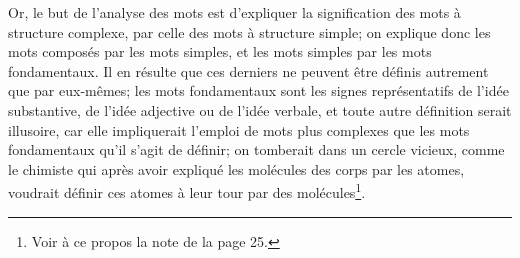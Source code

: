 {    Or, le but de l’analyse des mots est d’expliquer la signification
    des mots à structure complexe, par celle des mots à structure
    simple; on explique donc les mots composés par les mots simples,
    et les mots simples par les mots fondamentaux. Il en résulte que
    ces derniers ne peuvent être définis autrement que par eux-mêmes;
    les mots fondamentaux sont les signes représentatifs de l’idée
    substantive, de l’idée adjective ou de l’idée verbale, et toute
    autre définition serait illusoire, car elle impliquerait l’emploi
    de mots plus complexes que les mots fondamentaux qu’il s’agit de
    définir; on tomberait dans un cercle vicieux, comme le chimiste
    qui après avoir expliqué les molécules des corps par les atomes,
    voudrait définir ces atomes à leur tour par des
    molécules\footnote{Voir à ce propos la note de la page 25.}.
  }
  
